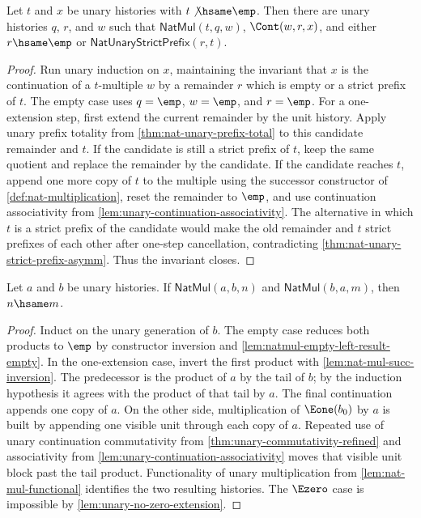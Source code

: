 \begin{lemma}
\label{lem:unary-division-by-nonempty-divisor}
Let $t$ and $x$ be unary histories with $t\not\hsame\emp$. Then there are unary histories $q$, $r$, and $w$ such that $\mathsf{NatMul}(t,q,w)$, $\Cont(w,r,x)$, and either $r\hsame\emp$ or $\mathsf{NatUnaryStrictPrefix}(r,t)$.
\end{lemma}
\begin{proof}
Run unary induction on $x$, maintaining the invariant that $x$ is the continuation of a $t$-multiple $w$ by a remainder $r$ which is empty or a strict prefix of $t$. The empty case uses $q=\emp$, $w=\emp$, and $r=\emp$. For a one-extension step, first extend the current remainder by the unit history. Apply unary prefix totality from \autoref{thm:nat-unary-prefix-total} to this candidate remainder and $t$. If the candidate is still a strict prefix of $t$, keep the same quotient and replace the remainder by the candidate. If the candidate reaches $t$, append one more copy of $t$ to the multiple using the successor constructor of \autoref{def:nat-multiplication}, reset the remainder to $\emp$, and use continuation associativity from \autoref{lem:unary-continuation-associativity}. The alternative in which $t$ is a strict prefix of the candidate would make the old remainder and $t$ strict prefixes of each other after one-step cancellation, contradicting \autoref{thm:nat-unary-strict-prefix-asymm}. Thus the invariant closes.
\end{proof}

\begin{lemma}
\label{lem:nat-mul-commutative-hsame}
Let $a$ and $b$ be unary histories. If $\mathsf{NatMul}(a,b,n)$ and $\mathsf{NatMul}(b,a,m)$, then $n\hsame m$.
\end{lemma}
\begin{proof}
Induct on the unary generation of $b$. The empty case reduces both products to $\emp$ by constructor inversion and \autoref{lem:natmul-empty-left-result-empty}. In the one-extension case, invert the first product with \autoref{lem:nat-mul-succ-inversion}. The predecessor is the product of $a$ by the tail of $b$; by the induction hypothesis it agrees with the product of that tail by $a$. The final continuation appends one copy of $a$. On the other side, multiplication of $\Eone(b_0)$ by $a$ is built by appending one visible unit through each copy of $a$. Repeated use of unary continuation commutativity from \autoref{thm:unary-commutativity-refined} and associativity from \autoref{lem:unary-continuation-associativity} moves that visible unit block past the tail product. Functionality of unary multiplication from \autoref{lem:nat-mul-functional} identifies the two resulting histories. The $\Ezero$ case is impossible by \autoref{lem:unary-no-zero-extension}.
\end{proof}

